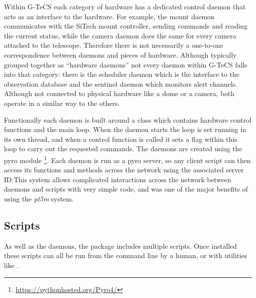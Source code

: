 \begin{colsection}
\begin{colsection}
Within G-TeCS each category of hardware has a dedicated control daemon that acts as an interface to the hardware. For example, the mount daemon communicates with the SiTech mount controller, sending commands and reading the current status, while the camera daemon does the same for every camera attached to the telescope. Therefore there is not necessarily a one-to-one correspondence between daemons and pieces of hardware. Although typically grouped together as ``hardware daemons'' not every daemon within G-TeCS falls into that category: there is the scheduler daemon which is the interface to the observation database and the sentinel daemon which monitors alert channels. Although not connected to physical hardware like a dome or a camera, both operate in a similar way to the others.

Functionally each daemon is built around a  class which contains hardware control functions and the main loop. When the daemon starts the loop is set running in its own thread, and when a control function is called it sets a flag within this loop to carry out the requested commands. The daemons are created using the \gls{pyro} module \footnote{\url{https://pythonhosted.org/Pyro4/}}. Each daemon is run as a \gls{pyro} server, so any client script can then access its functions and methods across the network using the associated server ID.\@ This system allows complicated interactions across the network between daemons and scripts with very simple code, and was one of the major benefits of using the \textit{pt5m} system.

\end{colsection}


\subsection{Scripts}
\label{sec:scripts}
\begin{colsection}

As well as the daemons, the  package includes multiple  scripts. Once installed these scripts can all be run from the command line by a human, or with utilities like .


\end{colsection}
\end{colsection}
